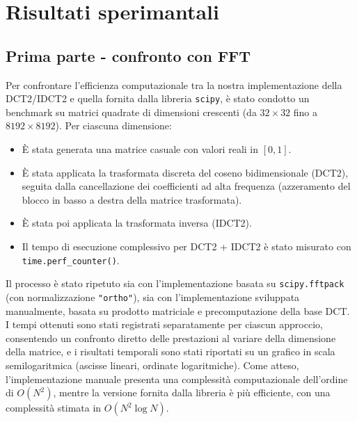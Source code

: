 \section{Risultati sperimantali}
\subsection{Prima parte - confronto con FFT}
Per confrontare l'efficienza computazionale tra la nostra implementazione della DCT2/IDCT2 e quella fornita dalla libreria \texttt{scipy}, è stato condotto un benchmark su matrici quadrate di dimensioni crescenti (da $32 \times 32$ fino a $8192 \times 8192$).
\newline
Per ciascuna dimensione:
\begin{itemize}
\item È stata generata una matrice casuale con valori reali in $[0,1]$.
\item È stata applicata la trasformata discreta del coseno bidimensionale (DCT2), seguita dalla cancellazione dei coefficienti ad alta frequenza (azzeramento del blocco in basso a destra della matrice trasformata).
\item È stata poi applicata la trasformata inversa (IDCT2).
\item Il tempo di esecuzione complessivo per DCT2 + IDCT2 è stato misurato con \texttt{time.perf\_counter()}.
\end{itemize}

Il processo è stato ripetuto sia con l’implementazione basata su \texttt{scipy.fftpack} (con normalizzazione \texttt{"ortho"}), sia con l’implementazione sviluppata manualmente, basata su prodotto matriciale e precomputazione della base DCT. \\

I tempi ottenuti sono stati registrati separatamente per ciascun approccio, consentendo un confronto diretto delle prestazioni al variare della dimensione della matrice, e i risultati temporali sono stati riportati su un grafico in scala semilogaritmica (ascisse lineari, ordinate logaritmiche).
Come atteso, l’implementazione manuale presenta una complessità computazionale dell’ordine di \( O(N^2) \), mentre la versione fornita dalla libreria è più efficiente, con una complessità stimata in \( O(N^2 \log N) \).

